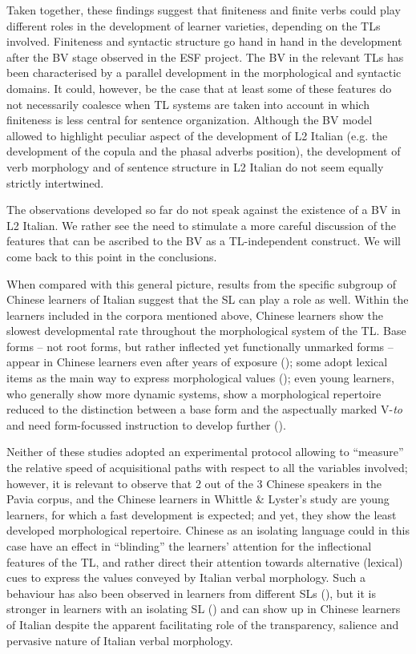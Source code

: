\documentclass[output=paper]{langscibook}
\begin{document}
Taken together, these findings suggest that finiteness and finite verbs could play different roles in the development of learner varieties, depending on the TLs involved. Finiteness and syntactic structure go hand in hand in the development after the BV stage observed in the ESF project. The BV in the relevant TLs has been characterised by a parallel development in the morphological and syntactic domains. It could, however, be the case that at least some of these features do not necessarily coalesce when TL systems are taken into account in which finiteness is less central for sentence organization. Although the BV model allowed to highlight peculiar aspect of the development of L2 Italian (e.g. the development of the copula and the phasal adverbs position), the development of verb morphology and of sentence structure in L2 Italian do not seem equally strictly intertwined.

The observations developed so far do not speak against the existence of a BV in L2 Italian. We rather see the need to stimulate a more careful discussion of the features that can be ascribed to the BV as a TL-independent construct. We will come back to this point in the conclusions.

When compared with this general picture, results from the specific subgroup of Chinese learners of Italian suggest that the SL can play a role as well. Within the learners included in the corpora mentioned above, Chinese learners show the slowest developmental rate throughout the morphological system of the TL. Base forms – not root forms, but rather inflected yet functionally unmarked forms – appear in Chinese learners even after years of exposure (\citealt{Banfi1990, BerrettaCrotta1991}); some adopt lexical items as the main way to express morphological values (\citealt{MassarielloMerzagora1990}); even young learners, who generally show more dynamic systems, show a morphological repertoire reduced to the distinction between a base form and the aspectually marked V-\textit{to} \citep{Valentini1992} and need form-focussed instruction to develop further (\citealt{WhittleLyster2016}).

Neither of these studies adopted an experimental protocol allowing to “measure” the relative speed of acquisitional paths with respect to all the variables involved; however, it is relevant to observe that 2 out of the 3 Chinese speakers in the Pavia corpus, and the Chinese learners in Whittle \& Lyster’s study are young learners, for which a fast development is expected; and yet, they show the least developed morphological repertoire. Chinese as an isolating language could in this case have an effect in “blinding” the learners’ attention for the inflectional features of the TL, and rather direct their attention towards alternative (lexical) cues to express the values conveyed by Italian verbal morphology. Such a behaviour has also been observed in learners from different SLs (\citealt{VanPatten2015}), but it is stronger in learners with an isolating SL (\citealt{EllisSagarra2010}) and can show up in Chinese learners of Italian despite the apparent facilitating role of the transparency, salience and pervasive nature of Italian verbal morphology.
\end{document}
